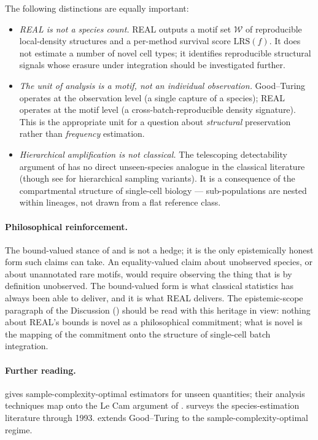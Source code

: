 The following distinctions are equally important:
\begin{itemize}[leftmargin=*]
  \item \emph{REAL is not a species count.} REAL outputs a motif set $\mathcal{W}$ of reproducible local-density structures and a per-method survival score $\mathrm{LRS}(f)$. It does not estimate a number of novel cell types; it identifies reproducible structural signals whose erasure under integration should be investigated further.
  \item \emph{The unit of analysis is a motif, not an individual observation.} Good--Turing operates at the observation level (a single capture of a species); REAL operates at the motif level (a cross-batch-reproducible density signature). This is the appropriate unit for a question about \emph{structural} preservation rather than \emph{frequency} estimation.
  \item \emph{Hierarchical amplification is not classical.} The telescoping detectability argument of  has no direct unseen-species analogue in the classical literature (though see \citet{orlitsky2016optimal} for hierarchical sampling variants). It is a consequence of the compartmental structure of single-cell biology --- sub-populations are nested within lineages, not drawn from a flat reference class.
\end{itemize}

\paragraph*{Philosophical reinforcement.}
The bound-valued stance of \citet{good1953population} and \citet{chao1984nonparametric} is not a hedge; it is the only epistemically honest form such claims can take. An equality-valued claim about unobserved species, or about unannotated rare motifs, would require observing the thing that is by definition unobserved. The bound-valued form is what classical statistics has always been able to deliver, and it is what REAL delivers. The epistemic-scope paragraph of the Discussion () should be read with this heritage in view: nothing about REAL's bounds is novel as a philosophical commitment; what is novel is the mapping of the commitment onto the structure of single-cell batch integration.

\paragraph*{Further reading.}
\citet{valiant2011estimating} gives sample-complexity-optimal estimators for unseen quantities; their analysis techniques map onto the Le Cam argument of . \citet{bunge1993species} surveys the species-estimation literature through 1993. \citet{orlitsky2016optimal} extends Good--Turing to the sample-complexity-optimal regime.

